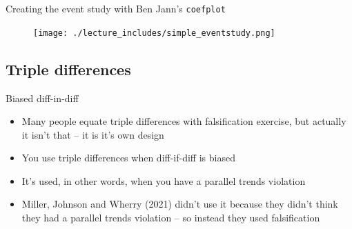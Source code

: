 \documentclass{beamer}
\begin{document}
\begin{frame}{Creating the event study with Ben Jann's \texttt{coefplot}}

	\begin{figure}
	\texttt{[image: ./lecture\_includes/simple\_eventstudy.png]}
	\end{figure}

\end{frame}





\subsection{Triple differences}




\begin{frame}{Biased diff-in-diff}

\begin{itemize}

\item Many people equate triple differences with falsification exercise, but actually it isn't that -- it is it's own design
\item You use triple differences when diff-if-diff is biased
\item It's used, in other words, when you have a parallel trends violation
\item Miller, Johnson and Wherry (2021) didn't use it because they didn't think they had a parallel trends violation -- so instead they used falsification
\end{itemize}

\end{frame}
\end{document}
